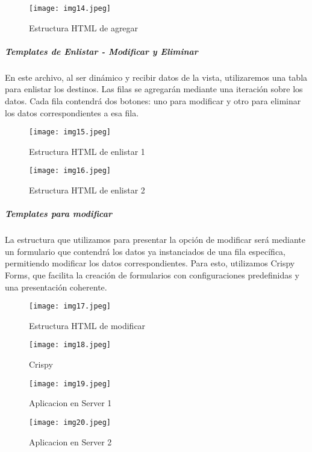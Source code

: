 \documentclass[10pt, a4paper]{article}
\begin{document}
	\begin{figure}[h]
		\centering
		\texttt{[image: img14.jpeg]}
		\caption{Estructura HTML de agregar}
	\end{figure}
	\vspace*{4cm}
	\subparagraph*{Templates de Enlistar - Modificar y Eliminar}
	\begin{flushleft}
		En este archivo, al ser dinámico y recibir datos de la vista, utilizaremos una tabla para enlistar los destinos. Las filas se agregarán mediante una iteración sobre los datos. Cada fila contendrá dos botones: uno para modificar y otro para eliminar los datos correspondientes a esa fila.
	\end{flushleft}
	\begin{figure}[h]
		\centering
		\texttt{[image: img15.jpeg]}
		\caption{Estructura HTML de enlistar 1}
	\end{figure}
	\begin{figure}[h]
		\centering
		\texttt{[image: img16.jpeg]}
		\caption{Estructura HTML de enlistar 2}
	\end{figure}
	\subparagraph*{Templates para modificar}
	\begin{flushleft}
		La estructura que utilizamos para presentar la opción de modificar será mediante un formulario que contendrá los datos ya instanciados de una fila específica, permitiendo modificar los datos correspondientes. Para esto, utilizamos Crispy Forms, que facilita la creación de formularios con configuraciones predefinidas y una presentación coherente.
	\end{flushleft}
	\begin{figure}[h]
		\centering
		\texttt{[image: img17.jpeg]}
		\caption{Estructura HTML de modificar}
	\end{figure}
	\begin{figure}[h]
		\centering
		\texttt{[image: img18.jpeg]}
		\caption{Crispy}
	\end{figure}
	\begin{figure}[h]
		\centering
		\texttt{[image: img19.jpeg]}
		\caption{Aplicacion en Server 1}
	\end{figure}
	\begin{figure}[h]
		\centering
		\texttt{[image: img20.jpeg]}
		\caption{Aplicacion en Server 2}
	\end{figure}
\end{document}
